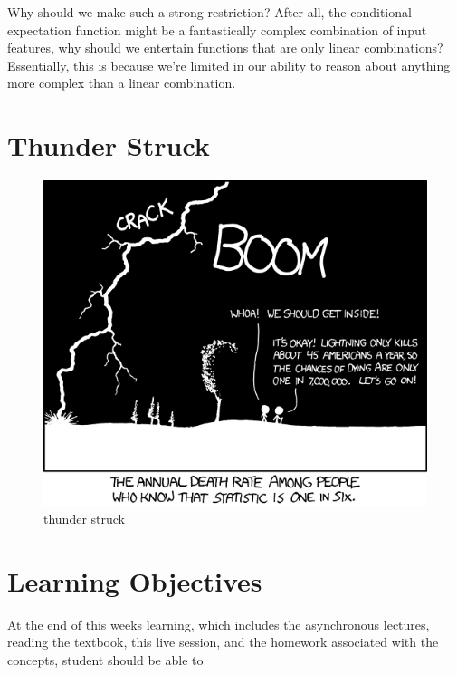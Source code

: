 \documentclass[
]{book}
\theoremstyle{definition}
\theoremstyle{definition}
\theoremstyle{definition}
\theoremstyle{definition}
\theoremstyle{remark}
\begin{document}
Why should we make such a strong restriction? After all, the conditional expectation function might be a fantastically complex combination of input features, why should we entertain functions that are only linear combinations? Essentially, this is because we're limited in our ability to reason about anything more complex than a linear combination.

\hypertarget{thunder-struck}{%
\section{Thunder Struck}\label{thunder-struck}}

\begin{figure}
\centering
\includegraphics{./images/conditional_risk.png}
\caption{thunder struck}
\end{figure}

\hypertarget{learning-objectives-3}{%
\section{Learning Objectives}\label{learning-objectives-3}}

At the end of this weeks learning, which includes the asynchronous lectures, reading the textbook, this live session, and the homework associated with the concepts, student should be able to
\end{document}
